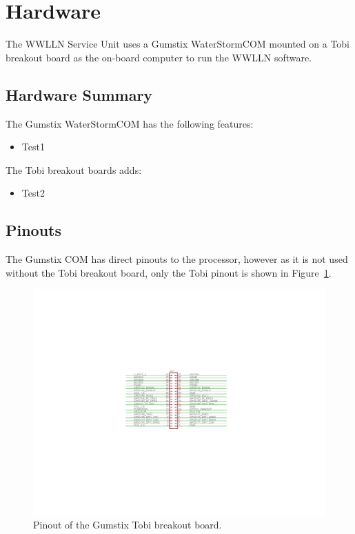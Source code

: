 \section{Hardware}

The WWLLN Service Unit uses a Gumstix WaterStormCOM mounted on a Tobi breakout board as the on-board computer to run the WWLLN software.

\subsection{Hardware Summary}

The Gumstix WaterStormCOM has the following features:

\begin{itemize}
\item Test1
\end{itemize}

The Tobi breakout boards adds:

\begin{itemize}
\item Test2
\end{itemize}

\subsection{Pinouts}

The Gumstix COM has direct pinouts to the processor, however as it is not used without the Tobi breakout board, only the Tobi pinout is shown in Figure~\ref{app:gumstix:fig:tobi}.

\begin{figure}[ht!]
   \centering
   \includegraphics[scale=1]{Appendix/Figures/tobi_pinout.pdf} 
   \caption{Pinout of the Gumstix Tobi breakout board.}
   \label{app:gumstix:fig:tobi}
\end{figure}

